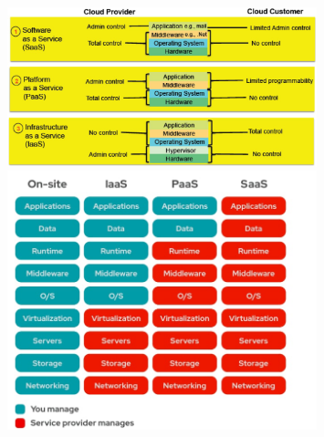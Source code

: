 \documentclass{article}
\begin{document}
		\begin{figure}[ht]
			\begin{minipage}{0.45\textwidth}
			\centering
			\includegraphics[width=0.8\textwidth]{SAC_05.png}
			\end{minipage}
			\begin{minipage}{0.45\textwidth}
				\centering
				\includegraphics[width=0.8\textwidth]{SAC_A2_service_paradigm.jpg}
			\end{minipage}
		\end{figure}
		
\end{document}
